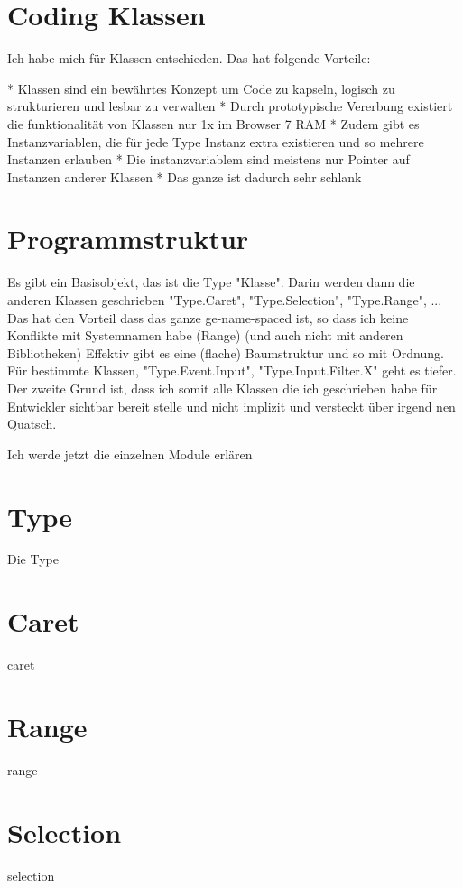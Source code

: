 \section{Coding Klassen}

Ich habe mich für Klassen entschieden. Das hat folgende Vorteile:

* Klassen sind ein bewährtes Konzept um Code zu kapseln, logisch zu strukturieren und lesbar zu verwalten
* Durch prototypische Vererbung existiert die funktionalität von Klassen nur 1x im Browser 7 RAM
* Zudem gibt es Instanzvariablen, die für jede Type Instanz extra existieren und so mehrere Instanzen erlauben
* Die instanzvariablem sind meistens nur Pointer auf Instanzen anderer Klassen
* Das ganze ist dadurch sehr schlank

\section{Programmstruktur}

Es gibt ein Basisobjekt, das ist die Type "Klasse".
Darin werden dann die anderen Klassen geschrieben "Type.Caret", "Type.Selection", "Type.Range", ...
Das hat den Vorteil dass das ganze ge-name-spaced ist, so dass ich keine Konflikte mit Systemnamen habe (Range) (und auch nicht mit anderen Bibliotheken)
Effektiv gibt es eine (flache) Baumstruktur und so mit Ordnung. Für bestimmte Klassen, "Type.Event.Input", "Type.Input.Filter.X" geht es tiefer.
Der zweite Grund ist, dass ich somit alle Klassen die ich geschrieben habe für Entwickler sichtbar bereit stelle und nicht implizit und versteckt über irgend nen Quatsch.

Ich werde jetzt die einzelnen Module erlären


\section{Type}

Die Type

\section{Caret}
caret
\section{Range}
range
\section{Selection}
selection
